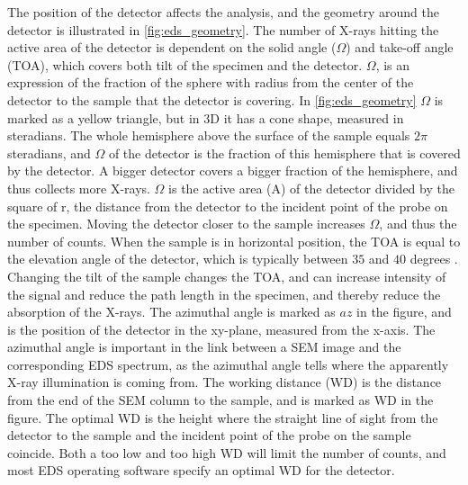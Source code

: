 The position of the detector affects the analysis, and the geometry around the detector is illustrated in \cref{fig:eds_geometry}.
The number of X-rays hitting the active area of the detector is dependent on the solid angle ($\Omega$) and take-off angle (TOA), which covers both tilt of the specimen and the detector.
$\Omega$, is an expression of the fraction of the sphere with radius from the center of the detector to the sample that the detector is covering.
In \cref{fig:eds_geometry} $\Omega$ is marked as a yellow triangle, but in 3D it has a cone shape, measured in steradians.
The whole hemisphere above the surface of the sample equals $2\pi$ steradians, and $\Omega$ of the detector is the fraction of this hemisphere that is covered by the detector.
A bigger detector covers a bigger fraction of the hemisphere, and thus collects more X-rays.
$\Omega$ is the active area (A) of the detector divided by the square of r, the distance from the detector to the incident point of the probe on the specimen.
Moving the detector closer to the sample increases $\Omega$, and thus the number of counts.
When the sample is in horizontal position, the TOA is equal to the elevation angle of the detector, which is typically between $35$ and $40$ degrees \cite{dtsaii_1_getting_started}.
Changing the tilt of the sample changes the TOA, and can increase intensity of the signal and reduce the path length in the specimen, and thereby reduce the absorption of the X-rays.
The azimuthal angle is marked as $az$ in the figure, and is the position of the detector in the xy-plane, measured from the x-axis.
The azimuthal angle is important in the link between a SEM image and the corresponding EDS spectrum, as the azimuthal angle tells where the apparently X-ray illumination is coming from.
The working distance (WD) is the distance from the end of the SEM column to the sample, and is marked as WD in the figure.
The optimal WD is the height where the straight line of sight from the detector to the sample and the incident point of the probe on the sample coincide.
Both a too low and too high WD will limit the number of counts, and most EDS operating software specify an optimal WD for the detector.




